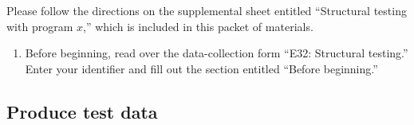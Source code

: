 %
%

Please follow the directions on the supplemental sheet entitled 
``Structural testing with program $x$,'' which is included in this
packet of materials. 

\begin{enumerate}

\item Before beginning, read over the data-collection form ``E32:
Structural testing.'' 
Enter your identifier and fill out the section entitled ``Before beginning.''

\end{enumerate}

\subsection*{Produce test data}

